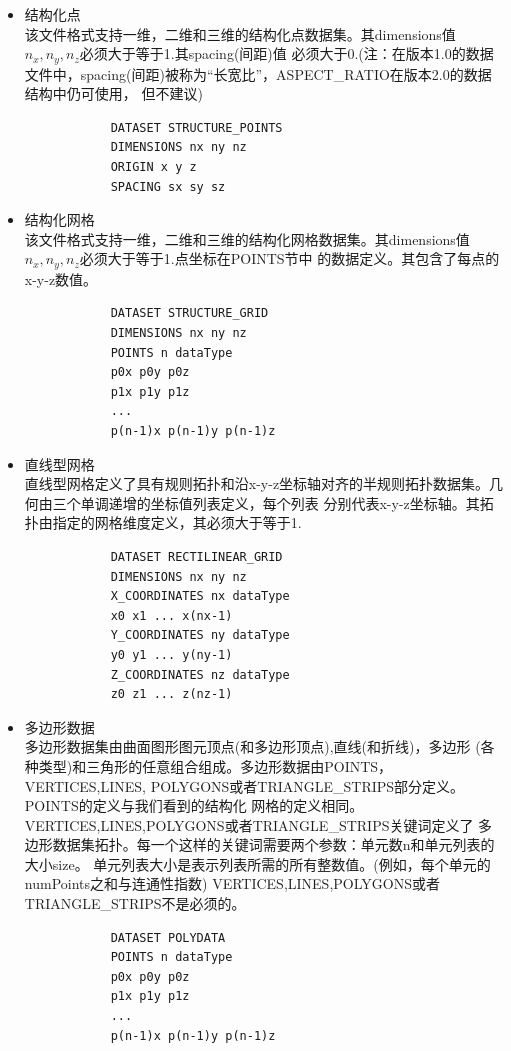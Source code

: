 \documentclass[UTF8]{ctexart}
\begin{document}
\begin{itemize}
    \item {
        结构化点 \\
        该文件格式支持一维，二维和三维的结构化点数据集。其dimensions值$n_x,n_y,n_z$必须大于等于1.其spacing(间距)值
        必须大于0.(注：在版本1.0的数据文件中，spacing(间距)被称为“长宽比”，ASPECT_RATIO在版本2.0的数据结构中仍可使用，
        但不建议) \\
        \begin{verbatim}
            DATASET STRUCTURE_POINTS 
            DIMENSIONS nx ny nz
            ORIGIN x y z
            SPACING sx sy sz
        \end{verbatim}
    }
    \item {
        结构化网格 \\
        该文件格式支持一维，二维和三维的结构化网格数据集。其dimensions值$n_x,n_y,n_z$必须大于等于1.点坐标在POINTS节中
        的数据定义。其包含了每点的x-y-z数值。
        \begin{verbatim}
            DATASET STRUCTURE_GRID
            DIMENSIONS nx ny nz
            POINTS n dataType
            p0x p0y p0z
            p1x p1y p1z
            ...
            p(n-1)x p(n-1)y p(n-1)z
        \end{verbatim}
    }
    \item {
        直线型网格 \\
        直线型网格定义了具有规则拓扑和沿x-y-z坐标轴对齐的半规则拓扑数据集。几何由三个单调递增的坐标值列表定义，每个列表
        分别代表x-y-z坐标轴。其拓扑由指定的网格维度定义，其必须大于等于1.
        \begin{verbatim}
            DATASET RECTILINEAR_GRID
            DIMENSIONS nx ny nz
            X_COORDINATES nx dataType
            x0 x1 ... x(nx-1)
            Y_COORDINATES ny dataType
            y0 y1 ... y(ny-1)
            Z_COORDINATES nz dataType
            z0 z1 ... z(nz-1)
        \end{verbatim}
    }
    \item {
        多边形数据 \\
        多边形数据集由曲面图形图元顶点(和多边形顶点),直线(和折线)，多边形
        (各种类型)和三角形的任意组合组成。多边形数据由POINTS，VERTICES,LINES,
        POLYGONS或者TRIANGLE_STRIPS部分定义。POINTS的定义与我们看到的结构化
        网格的定义相同。VERTICES,LINES,POLYGONS或者TRIANGLE_STRIPS关键词定义了
        多边形数据集拓扑。每一个这样的关键词需要两个参数：单元数n和单元列表的大小size。
        单元列表大小是表示列表所需的所有整数值。(例如，每个单元的numPoints之和与连通性指数)
        VERTICES,LINES,POLYGONS或者TRIANGLE_STRIPS不是必须的。
        \begin{verbatim}
            DATASET POLYDATA
            POINTS n dataType
            p0x p0y p0z
            p1x p1y p1z
            ... 
            p(n-1)x p(n-1)y p(n-1)z 


\end{verbatim}}
\end{itemize}
\end{document}
